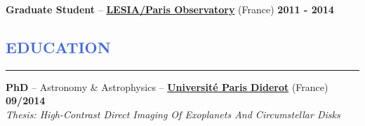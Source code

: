 \documentclass[11pt]{article}
\begin{document}
\vspace{-0.3cm}
\textbf{Graduate Student} --
\href{http://www.obspm.fr/?lang=en}{\textbf{LESIA/Paris Observatory}} (France)
\hfill        { \bf 2011 - 2014}\\




%


\vspace{-0.35cm}
\textcolor{RoyalBlue}{\section{\large EDUCATION}
\vspace{-0.35cm}\hrule}
\vspace{0.4cm}

\textbf{PhD} -- Astronomy \& Astrophysics --
\href{https://www.univ-paris-diderot.fr/}{\textbf{Universit\'e Paris Diderot}} (France)
\hfill  { \bf 09/2014}\\
{\small \it Thesis: High-Contrast Direct Imaging Of Exoplanets And Circumstellar Disks}\\
\end{document}
